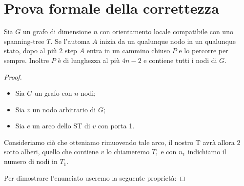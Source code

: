 \section{Prova formale della correttezza}
\begin{theorem}
    Sia $G$ un grafo di dimensione $n$ con orientamento locale
    compatibile con uno spanning-tree $T$. Se l'automa $A$ inizia da un qualunque nodo
    in un qualunque stato, dopo al più 2 step $A$ entra in un cammino chiuso $P$ e lo
    percorre per sempre. Inoltre $P$ è di lunghezza al più $4n-2$ e contiene tutti i
    nodi di $G$.
\end{theorem}
\begin{proof}\
    \begin{itemize}
        \item Sia $G$ un grafo con $n$ nodi;
        \item Sia $v$ un nodo arbitrario di $G$;
        \item Sia $e$ un arco dello ST di $v$ con porta 1.
    \end{itemize}
    Consideriamo ciò che otteniamo rimuovendo tale arco, il nostro T avrà allora 2
    sotto alberi, quello che contiene $v$ lo chiameremo $T_1$ e con $n_1$
    indichiamo il numero di nodi in $T_1$.

    Per dimostrare l'enunciato useremo la seguente proprietà:


\end{proof}
